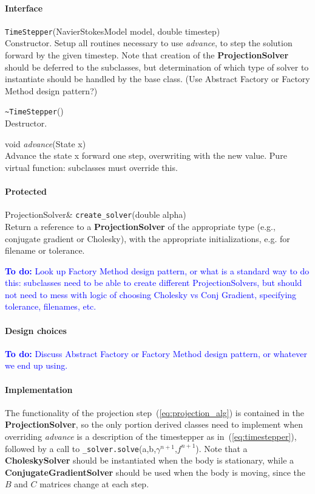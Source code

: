 \documentclass[11pt]{article}
\def\todo#1{\textcolor{blue}{{\bf To do:} #1}}
\def\class#1{{\bf #1}} %
\def\fn#1{{\tt #1}} %
\def\virtualfn#1{{\it #1}} %
\begin{document}
\paragraph{Interface}
\begin{description}
	\item \fn{TimeStepper}(NavierStokesModel model, double timestep)\\
		Constructor.  Setup all routines necessary to use \virtualfn{advance}, to step the solution forward by the given timestep.  Note that creation of the \class{ProjectionSolver} should be deferred to the subclasses, but determination of which type of solver to instantiate should be handled by the base class.  (Use Abstract Factory or Factory Method design pattern?)
	\item \fn{\~\null TimeStepper}()\\
		Destructor.
	\item void \virtualfn{advance}(State x)\\
	 	Advance the state x forward one step, overwriting with the new value.  Pure virtual function: subclasses must override this.
\end{description}
\paragraph{Protected}
\begin{description}
	\item ProjectionSolver\& \fn{create\_solver}(double alpha)\\
		Return a reference to a \class{ProjectionSolver} of the appropriate type (e.g., conjugate gradient or Cholesky), with the appropriate initializations, e.g. for filename or tolerance.
		
		\todo{Look up Factory Method design pattern, or what is a standard way to do this: subclasses need to be able to create different ProjectionSolvers, but should not need to mess with logic of choosing Cholesky vs Conj Gradient, specifying tolerance, filenames, etc.}
\end{description}

\paragraph{Design choices}
\todo{Discuss Abstract Factory or Factory Method design pattern, or whatever we end up using.}

\paragraph{Implementation}
The functionality of the projection step~(\ref{eq:projection_alg}) is contained in the \class{ProjectionSolver}, so the only portion derived classes need to implement when overriding \virtualfn{advance} is a description of the timestepper as in~(\ref{eq:timestepper}), followed by a call to \fn{\_solver.solve}(a,b,$\gamma^{n+1}$,$f^{n+1}$).  Note that a \class{CholeskySolver} should be instantiated when the body is stationary, while a \class{ConjugateGradientSolver} should be used when the body is moving, since the $B$ and $C$ matrices change at each step.
\end{document}

